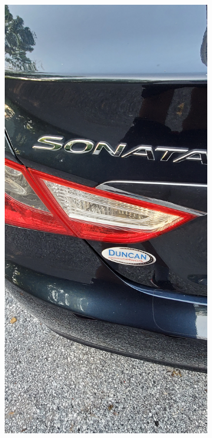 \documentclass[12pt]{article}
\begin{document}
\begin{figure}[!ht]
    \begin{subfigure}[b]{0.4\textwidth}
        \centering
        \includegraphics[width=\textwidth]{images/car_photos/20210703_192759.jpg} %

\end{subfigure}
\end{figure}
\end{document}
